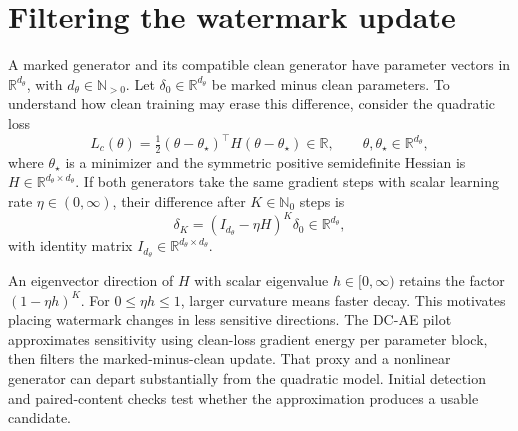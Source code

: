 \section{Filtering the watermark update}
\label{app:survival}
A marked generator and its compatible clean generator have parameter vectors in $\mathbb R^{d_\theta}$, with $d_\theta\in\mathbb N_{>0}$. Let $\delta_0\in\mathbb R^{d_\theta}$ be marked minus clean parameters. To understand how clean training may erase this difference, consider the quadratic loss
\[
 L_c(\theta)=\tfrac12(\theta-\theta_\star)^\top H(\theta-\theta_\star)\in\mathbb R,
 \qquad \theta,\theta_\star\in\mathbb R^{d_\theta},
\]
where $\theta_\star$ is a minimizer and the symmetric positive semidefinite Hessian is $H\in\mathbb R^{d_\theta\times d_\theta}$. If both generators take the same gradient steps with scalar learning rate $\eta\in(0,\infty)$, their difference after $K\in\mathbb N_0$ steps is
\[
 \delta_K=(I_{d_\theta}-\eta H)^K\delta_0\in\mathbb R^{d_\theta},
\]
with identity matrix $I_{d_\theta}\in\mathbb R^{d_\theta\times d_\theta}$.

An eigenvector direction of $H$ with scalar eigenvalue $h\in[0,\infty)$ retains the factor $(1-\eta h)^K$. For $0\leq\eta h\leq1$, larger curvature means faster decay. This motivates placing watermark changes in less sensitive directions. The DC-AE pilot approximates sensitivity using clean-loss gradient energy per parameter block, then filters the marked-minus-clean update. That proxy and a nonlinear generator can depart substantially from the quadratic model. Initial detection and paired-content checks test whether the approximation produces a usable candidate.
